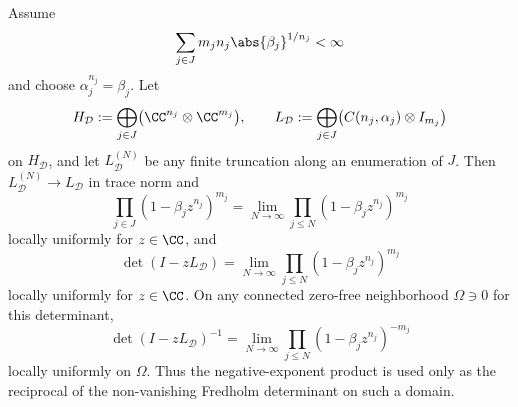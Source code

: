 \begin{lemma}
  \label{lem:cyclic-product-trace-norm-limit}
  Assume
  \[
    \sum_{j\in J}m_j n_j\abs{\beta_j}^{1/n_j}<\infty
  \]
  and choose \(\alpha_j^{n_j}=\beta_j\). Let
  \[
    H_{\mathcal D}
    :=\bigoplus_{j\in J}\bigl(\CC^{n_j}\otimes\CC^{m_j}\bigr),
    \qquad
    L_{\mathcal D}
    :=\bigoplus_{j\in J}\bigl(C(n_j,\alpha_j)\otimes I_{m_j}\bigr)
  \]
  on \(H_{\mathcal D}\), and let \(L_{\mathcal D}^{(N)}\) be any finite
  truncation along an enumeration of \(J\). Then
  \(L_{\mathcal D}^{(N)}\to L_{\mathcal D}\) in trace norm and
  \[
    \prod_{j\in J}(1-\beta_j z^{n_j})^{m_j}
    =\lim_{N\to\infty}
      \prod_{j\le N}(1-\beta_j z^{n_j})^{m_j}
  \]
  locally uniformly for \(z\in\CC\), and
  \[
    \det(I-zL_{\mathcal D})
    =\lim_{N\to\infty}
      \prod_{j\le N}(1-\beta_j z^{n_j})^{m_j}
  \]
  locally uniformly for \(z\in\CC\). On any connected zero-free
  neighborhood \(\Omega\ni0\) for this determinant,
  \[
    \det(I-zL_{\mathcal D})^{-1}
    =\lim_{N\to\infty}
      \prod_{j\le N}(1-\beta_j z^{n_j})^{-m_j}
  \]
  locally uniformly on \(\Omega\). Thus the negative-exponent product is
  used only as the reciprocal of the non-vanishing Fredholm determinant on
  such a domain.
\end{lemma}

